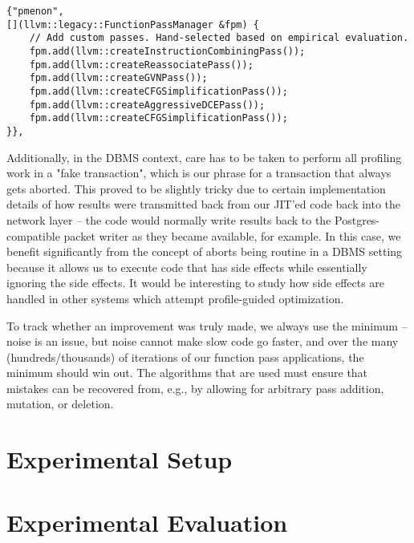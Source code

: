 \documentclass{vldb}
\begin{document}
\begin{lstlisting}
{"pmenon",
[](llvm::legacy::FunctionPassManager &fpm) {
    // Add custom passes. Hand-selected based on empirical evaluation.
    fpm.add(llvm::createInstructionCombiningPass());
    fpm.add(llvm::createReassociatePass());
    fpm.add(llvm::createGVNPass());
    fpm.add(llvm::createCFGSimplificationPass());
    fpm.add(llvm::createAggressiveDCEPass());
    fpm.add(llvm::createCFGSimplificationPass());
}}, 
\end{lstlisting}

Additionally, in the DBMS context, care has to be taken to perform all profiling work in a "fake transaction", which is our phrase for a transaction that always gets aborted. This proved to be slightly tricky due to certain implementation details of how results were transmitted back from our JIT'ed code back into the network layer -- the code would normally write results back to the Postgres-compatible packet writer as they became available, for example. In this case, we benefit significantly from the concept of aborts being routine in a DBMS setting because it allows us to execute code that has side effects while essentially ignoring the side effects. It would be interesting to study how side effects are handled in other systems which attempt profile-guided optimization.

To track whether an improvement was truly made, we always use the minimum -- noise is an issue, but noise cannot make slow code go faster, and over the many (hundreds/thousands) of iterations of our function pass applications, the minimum should win out. The algorithms that are used must ensure that mistakes can be recovered from, e.g., by allowing for arbitrary pass addition, mutation, or deletion.


\section{Experimental Setup}


\section{Experimental Evaluation}
\end{document}
